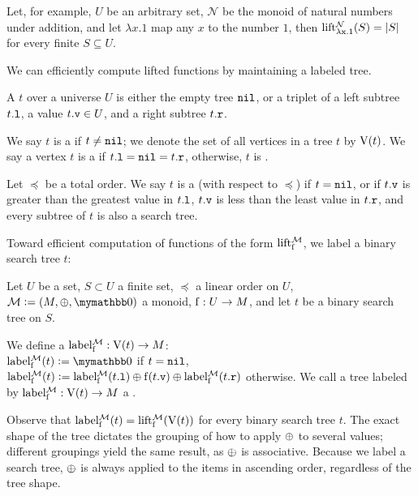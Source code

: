 \documentclass[conference]{IEEEtran}
\begin{document}
Let, for example, $U$ be an arbitrary set, $\mathcal{N}$ be the monoid of natural numbers under addition, and let $\lambda x.1$ map any $x$ to the number $1$, then $\operatorname{lift_{\lambda x.1}^{\mathcal{N}}}(S) = |{S}|$ for every finite $S \subseteq U$.

We can efficiently compute lifted functions by maintaining a labeled tree.

\begin{definition}
A  $t$ over a universe $U$ is either the empty tree $\mathtt{nil}$, or a triplet of a left subtree ${t}\mathtt{.l}$, a value ${t}\mathtt{.v} \in U$, and a right subtree ${t}\mathtt{.r}$.

We say $t$ is a  if $t \neq \mathtt{nil}$; we denote the set of all vertices in a tree $t$ by $\operatorname{V}(t)$. We say a vertex $t$ is a  if ${t}\mathtt{.l} = \mathtt{nil} = {t}\mathtt{.r}$, otherwise, $t$ is .

Let $\preceq$ be a total order. We say $t$ is a  (with respect to $\preceq$) if $t = \mathtt{nil}$, or if ${t}\mathtt{.v}$ is greater than the greatest value in ${t}\mathtt{.l}$, ${t}\mathtt{.v}$ is less than the least value in ${t}\mathtt{.r}$, and every subtree of $t$ is also a search tree.
\end{definition}

Toward efficient computation of functions of the form $\operatorname{lift_{\operatorname{f}}^{\mathcal{M}}}$, we label a binary search tree $t$:

\begin{definition}
Let $U$ be a set, $S \subset U$ a finite set, $\preceq$ a linear order on $U$, $\mathcal{M} \defeq (M, \groupaddsym, \neutraladd)$ a monoid, ${\operatorname{f}}: {U} \rightarrow {M}$, and let $t$ be a binary search tree on $S$.

We define a  ${\operatorname{label_{\operatorname{f}}^{\mathcal{M}}}}: {\operatorname{V}(t)} \rightarrow {M}$:\\
$\liftlabel{\f}{\mathcal{M}}(t) \defeq \neutraladd$ if $t = \mathtt{nil}$,\\
$\operatorname{label_{\operatorname{f}}^{\mathcal{M}}}(t) \vcentcolon= {\operatorname{label_{\operatorname{f}}^{\mathcal{M}}}({t}\mathtt{.l})} \oplus {{\operatorname{f}({t}\mathtt{.v})} \oplus{\operatorname{label_{\operatorname{f}}^{\mathcal{M}}}({t}\mathtt{.r})}}$ otherwise.
We call a tree labeled by ${\operatorname{label_{\operatorname{f}}^{\mathcal{M}}}}: {\operatorname{V}(t)} \rightarrow {M}$ a .
\end{definition}

Observe that $\operatorname{label_{\operatorname{f}}^{\mathcal{M}}}(t) = \operatorname{lift_{\operatorname{f}}^{\mathcal{M}}}(\operatorname{V}(t))$ for every binary search tree $t$. The exact shape of the tree dictates the grouping of how to apply $\oplus$ to several values; different groupings yield the same result, as $\oplus$ is associative. Because we label a search tree, $\oplus$ is always applied to the items in ascending order, regardless of the tree shape.
\end{document}
